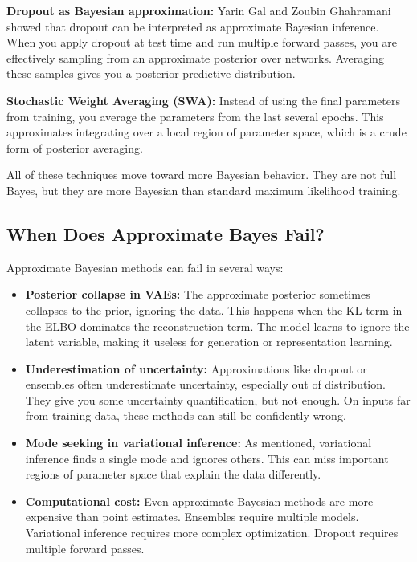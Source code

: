 \textbf{Dropout as Bayesian approximation:} Yarin Gal and Zoubin Ghahramani showed that dropout can be interpreted as approximate Bayesian inference. When you apply dropout at test time and run multiple forward passes, you are effectively sampling from an approximate posterior over networks. Averaging these samples gives you a posterior predictive distribution.

\textbf{Stochastic Weight Averaging (SWA):} Instead of using the final parameters from training, you average the parameters from the last several epochs. This approximates integrating over a local region of parameter space, which is a crude form of posterior averaging.

All of these techniques move toward more Bayesian behavior. They are not full Bayes, but they are more Bayesian than standard maximum likelihood training.

\subsection{When Does Approximate Bayes Fail?}

Approximate Bayesian methods can fail in several ways:

\begin{itemize}
\item \textbf{Posterior collapse in VAEs:} The approximate posterior sometimes collapses to the prior, ignoring the data. This happens when the KL term in the ELBO dominates the reconstruction term. The model learns to ignore the latent variable, making it useless for generation or representation learning.

\item \textbf{Underestimation of uncertainty:} Approximations like dropout or ensembles often underestimate uncertainty, especially out of distribution. They give you some uncertainty quantification, but not enough. On inputs far from training data, these methods can still be confidently wrong.

\item \textbf{Mode seeking in variational inference:} As mentioned, variational inference finds a single mode and ignores others. This can miss important regions of parameter space that explain the data differently.

\item \textbf{Computational cost:} Even approximate Bayesian methods are more expensive than point estimates. Ensembles require multiple models. Variational inference requires more complex optimization. Dropout requires multiple forward passes.
\end{itemize}

